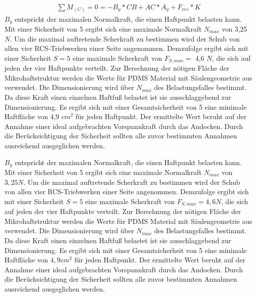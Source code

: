 \begin{eqnarray}
		\sum{  }{  }{ M_{(C)} }=0=-B_y*CB+AC*A_y+F_{res}*K
\end{eqnarray}
$B_y$ entspricht der maximalen Normalkraft, die einen Haftpunkt belasten kann. Mit einer Sicherheit von 5 ergibt sich eine maximale Normalkraft $N_{max}$ von 3,25 $N$. Um die maximal auftretende Scherkraft zu bestimmen wird der Schub von allen vier RCS-Triebwerken einer Seite angenommen. Demzufolge ergibt sich mit einer Sicherheit $S = 5$ eine maximale Scherkraft von $F_{S, max} =$ 4,6 $N$, die sich auf jeden der vier Haftpunkte verteilt. Zur Berechnung der nötigen Fläche der Mikrohaftstruktur werden die Werte für PDMS Material mit Säulengeometrie aus \cite[Tabelle1, Seite 23]{Schwerter.} verwendet. Die Dimensionierung wird über $N_{max}$ des Belastungsfalles bestimmt. Da diese Kraft einen einzelnen Haftfuß belastet ist sie ausschlaggebend zur Dimensionierung. Es ergibt sich mit einer Gesamtsicherheit von 5 eine minimale Haftfläche von 4,9 $cm^{2}$ für jeden Haftpunkt. Der ermittelte Wert beruht auf der Annahme einer ideal aufgebrachten Vorspannkraft durch das Andocken. Durch die Berücksichtigung der Sicherheit sollten alle zuvor bestimmten Annahmen ausreichend ausgeglichen werden. 

	$B_y$ entspricht der maximalen Normalkraft, die einen Haftpunkt belasten kann. Mit einer Sicherheit von 5 ergibt sich eine maximale Normalkraft $N_{max}$ von $3,25 N$. Um die maximal auftretende Scherkraft zu bestimmen wird der Schub von allen vier RCS-Triebwerken einer Seite angenommen. Demzufolge ergibt sich mit einer Sicherheit $S = 5$ eine maximale Scherkraft von $F_{S, max} = 4,6 N$, die sich auf jeden der vier Haftpunkte verteilt. Zur Berechnung der nötigen Fläche der Mikrohaftstruktur werden die Werte für PDMS Material mit Säulengeometrie aus \cite[Tabelle1, Seite 23]{Schwerter.} verwendet. Die Dimensionierung wird über $N_{max}$ des Belastungsfalles bestimmt. Da diese Kraft einen einzelnen Haftfuß belastet ist sie ausschlaggebend zur Dimensionierung. Es ergibt sich mit einer Gesamtsicherheit von 5 eine minimale Haftfläche von $4,9 cm^{2}$ für jeden Haftpunkt. Der ermittelte Wert beruht auf der Annahme einer ideal aufgebrachten Vorspannkraft durch das Andocken. Durch die Berücksichtigung der Sicherheit sollten alle zuvor bestimmten Annahmen ausreichend ausgeglichen werden. 




		
